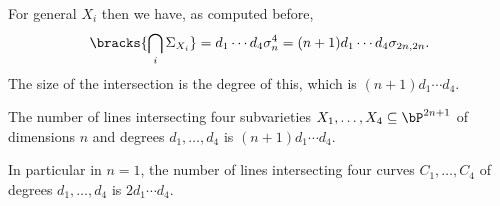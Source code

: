 For general $X_i$ then we have, as computed before,
$$ \bracks{\bigcap_i\Sigma_{X_i}} = d_1\cdots d_4\sigma_n^4 = (n+1)d_1\cdots d_4\sigma_{2n,2n} . $$
The size of the intersection is the degree of this, which is $(n+1)d_1\cdots d_4$.

\bansw

    The number of lines intersecting four subvarieties $X_1,\dots,X_4\subseteq\bP^{2n+1}$ of dimensions $n$
    and degrees $d_1,\dots,d_4$ is $(n+1)d_1\cdots d_4$.

    In particular in $n=1$, the number of lines intersecting four curves $C_1,\dots,C_4$ of degrees
    $d_1,\dots,d_4$ is $2d_1\cdots d_4$.

\eansw


\bye

